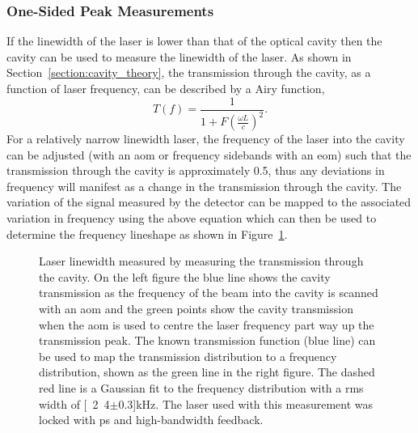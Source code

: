 \subsubsection{One-Sided Peak Measurements}\label{section:one_sided_peak}

If the linewidth of the laser is lower than that of the optical cavity then the cavity can be used to measure the linewidth of the laser.
As shown in Section~\ref{section:cavity_theory}, the transmission through the cavity, as a function of laser frequency, can be described by a Airy function,
\begin{equation}
T(f) = \frac{1}{1+F\left(\frac{\omega L}{c}\right)^2}.
\end{equation}
For a relatively narrow linewidth laser, the frequency of the laser into the cavity can be adjusted (with an \gls{aom} or frequency sidebands with an \gls{eom}) such that the transmission through the cavity is approximately 0.5, thus any deviations in frequency will manifest as a change in the transmission through the cavity.
The variation of the signal measured by the detector can be mapped to the associated variation in frequency using the above equation which can then be used to determine the frequency lineshape as shown in Figure~\ref{figure:side_of_peak}.

\begin{figure}
\center

\caption[Laser linewidth measured by examining cavity transmission on one side of the cavity transmission peak.]{Laser linewidth measured by measuring the transmission through the cavity. On the left figure the blue line shows the cavity transmission as the frequency of the beam into the cavity is scanned with an \gls{aom} and the green points show the cavity transmission when the \gls{aom} is used to centre the laser frequency part way up the transmission peak.
The known transmission function (blue line) can be used to map the transmission distribution to a frequency distribution, shown as the green line in the right figure.
The dashed red line is a Gaussian fit to the frequency distribution with a \gls{rms} width of \unit[2.4$\pm$0.3]{kHz}.
The laser used with this measurement was locked with \gls{ps} and high-bandwidth feedback.}
\label{figure:side_of_peak}
\end{figure}

